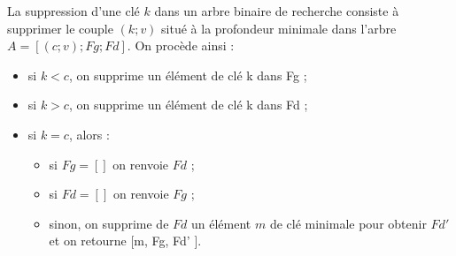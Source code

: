 \documentclass[letterpaper,10pt,english]{jupyterBook}
\begin{document}
\sphinxAtStartPar
La suppression d’une clé \(k\) dans un arbre binaire de recherche consiste à supprimer le couple \((k;v)\) situé à la profondeur minimale dans l’arbre \(A = [(c;v);Fg;Fd].\) On procède ainsi :
\begin{itemize}
\item {} 
\sphinxAtStartPar
si \(k < c\), on supprime un élément de clé k dans Fg ;

\item {} 
\sphinxAtStartPar
si \(k > c\), on supprime un élément de clé k dans Fd ;

\item {} 
\sphinxAtStartPar
si \(k = c\), alors :
\begin{itemize}
\item {} 
\sphinxAtStartPar
si \(Fg = [ ]\) on renvoie \(Fd\) ;

\item {} 
\sphinxAtStartPar
si \(Fd = [ ]\) on renvoie \(Fg\) ;

\item {} 
\sphinxAtStartPar
sinon, on supprime de \(Fd\) un élément \(m\) de clé minimale pour obtenir \(Fd'\) et on retourne {[}m, Fg, Fd’ {]}.

\end{itemize}

\end{itemize}
\end{document}
